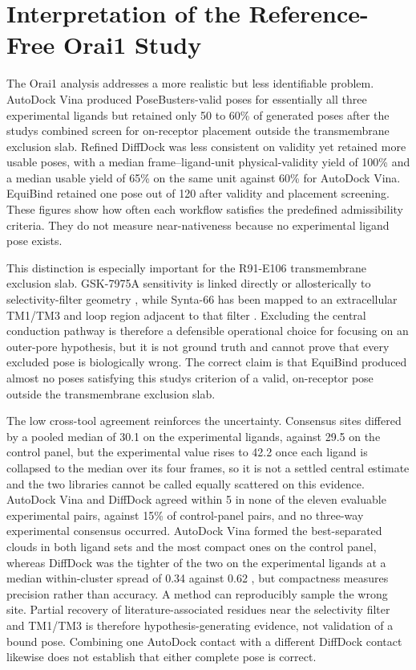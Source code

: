 \hypertarget{interpretation-of-the-reference-free-orai1-study}{%
\section{Interpretation of the Reference-Free Orai1 Study}\label{interpretation-of-the-reference-free-orai1-study}}

The Orai1 analysis addresses a more realistic but less identifiable problem. AutoDock Vina produced PoseBusters-valid poses for essentially all three experimental ligands but retained only 50 to 60\% of generated poses after the study\textquotesingle s combined screen for on-receptor placement outside the transmembrane exclusion slab. Refined DiffDock was less consistent on validity yet retained more usable poses, with a median frame--ligand-unit physical-validity yield of 100\% and a median usable yield of 65\% on the same unit against 60\% for AutoDock Vina. EquiBind retained one pose out of 120 after validity and placement screening. These figures show how often each workflow satisfies the predefined admissibility criteria. They do not measure near-nativeness because no experimental ligand pose exists.

This distinction is especially important for the R91-E106 transmembrane exclusion slab. GSK-7975A sensitivity is linked directly or allosterically to selectivity-filter geometry \cite{ref070}, while Synta-66 has been mapped to an extracellular TM1/TM3 and loop region adjacent to that filter \cite{ref071}. Excluding the central conduction pathway is therefore a defensible operational choice for focusing on an outer-pore hypothesis, but it is not ground truth and cannot prove that every excluded pose is biologically wrong. The correct claim is that EquiBind produced almost no poses satisfying this study\textquotesingle s criterion of a valid, on-receptor pose outside the transmembrane exclusion slab.

The low cross-tool agreement reinforces the uncertainty. Consensus sites differed by a pooled median of 30.1 \angstrom{} on the experimental ligands, against 29.5 \angstrom{} on the control panel, but the experimental value rises to 42.2 \angstrom{} once each ligand is collapsed to the median over its four frames, so it is not a settled central estimate and the two libraries cannot be called equally scattered on this evidence. AutoDock Vina and DiffDock agreed within 5 \angstrom{} in none of the eleven evaluable experimental pairs, against 15\% of control-panel pairs, and no three-way experimental consensus occurred. AutoDock Vina formed the best-separated clouds in both ligand sets and the most compact ones on the control panel, whereas DiffDock was the tighter of the two on the experimental ligands at a median within-cluster spread of 0.34 against 0.62 \angstrom{}, but compactness measures precision rather than accuracy. A method can reproducibly sample the wrong site. Partial recovery of literature-associated residues near the selectivity filter and TM1/TM3 is therefore hypothesis-generating evidence, not validation of a bound pose. Combining one AutoDock contact with a different DiffDock contact likewise does not establish that either complete pose is correct.

